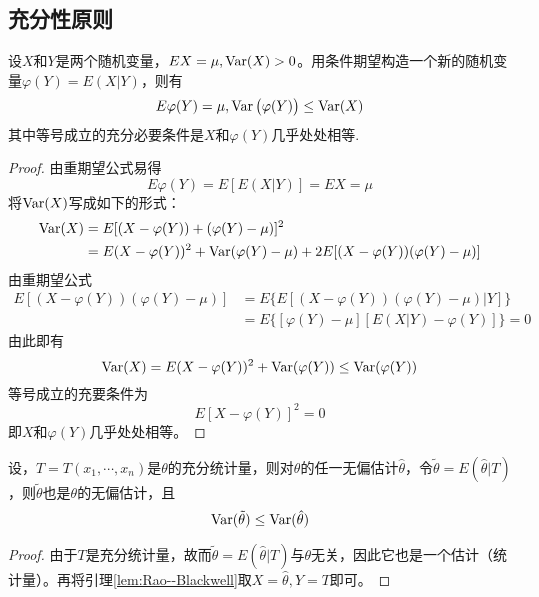 \subsection{充分性原则}

\begin{lemma}\label{lem:Rao--Blackwell}
    设$X$和$Y$是两个随机变量，$EX=\mu,\operatorname{Var}(X)>0$。用条件期望构造一个新的随机变量$\varphi(Y)=E(X|Y)$，则有
    \[ E\varphi(Y) = \mu,\operatorname{Var}\big(\varphi(Y)\big) \le \operatorname{Var}(X) \]
    其中等号成立的充分必要条件是$X$和$\varphi(Y)$几乎处处相等.
\end{lemma}
\begin{proof}
    由重期望公式易得
    \[ E\varphi(Y)=E[E(X|Y)]=EX=\mu \]
    将$\operatorname{Var}(X)$写成如下的形式：
    \begin{align*}
        \operatorname{Var}(X) & = E[(X-\varphi(Y)) + (\varphi(Y) - \mu)]^2                                                       \\
                & = E(X-\varphi(Y))^2 + \operatorname{Var}(\varphi(Y)-\mu) + 2 E[(X-\varphi(Y))(\varphi(Y) - \mu)]
    \end{align*}
    由重期望公式
    \begin{align*}
        E[(X-\varphi(Y))(\varphi(Y) - \mu)] & =E\{ E[(X-\varphi(Y))(\varphi(Y) - \mu)|Y] \} \\
                                            & =E\{ [\varphi(Y)-\mu][E(X|Y)-\varphi(Y)] \}=0
    \end{align*}
    由此即有
    \[ \operatorname{Var}(X) = E(X-\varphi(Y))^2 + \operatorname{Var}(\varphi(Y)) \le \operatorname{Var}(\varphi(Y)) \]
    等号成立的充要条件为
    \[ E[X-\varphi(Y)]^2 = 0 \]
    即$X$和$\varphi(Y)$几乎处处相等。
\end{proof}

\begin{theorem}[充分性原则]
    设，$T=T(x_1,\cdots,x_n)$是$\theta$的充分统计量，则对$\theta$的任一无偏估计$\hat\theta$，令$\tilde\theta=E(\hat\theta|T)$，则$\tilde\theta$也是$\theta$的无偏估计，且
    \[ \operatorname{Var}(\tilde\theta) \le \operatorname{Var}(\hat\theta) \]
\end{theorem}
\begin{proof}
    由于$T$是充分统计量，故而$\tilde\theta=E(\hat\theta|T)$与$\theta$无关，因此它也是一个估计（统计量）。再将引理\ref{lem:Rao--Blackwell}取$X=\hat\theta,Y=T$即可。
\end{proof}

